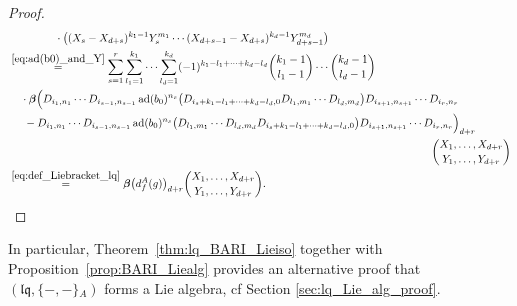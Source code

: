 \documentclass[12pt,reqno]{amsart}
\numberwithin{equation}{section}
\theoremstyle{definition}
\newcommand{\bimap}{\boldsymbol{\beta}}
\newcommand{\ad}{\operatorname{ad}}
\newcommand{\lqq}{\mathfrak{lq}}
\newcommand{\ariemp}{\{-,-\}\!_A}
\newcommand{\der}[1]{d_{#1}^A}
\begin{document}
\begin{proof}
\begin{align*}
&\hspace{1.5cm}\cdot\big((X_s-X_{d+s})^{k_1-1}Y_s^{m_1}\cdots (X_{d+s-1}-X_{d+s})^{k_d-1}Y_{d+s-1}^{m_d}\big) \\
&\overset{\eqref{eq:ad(b0)_and_Y}}{=}\sum_{s=1}^r \sum_{l_1=1}^{k_1}\cdots \sum_{l_d=1}^{k_d} (-1)^{k_1-l_1+\cdots+k_d-l_d} \binom{k_1-1}{l_1-1}\cdots \binom{k_d-1}{l_d-1} \\
&\hspace{0.4cm}\cdot\bimap\Big(D_{i_1,n_1}\cdots D_{i_{s-1},n_{s-1}}\ad(b_0)^{n_s}\big(D_{i_s+k_1-l_1+\cdots+k_d-l_d,0}D_{l_1,m_1}\cdots D_{l_d,m_d}\big)D_{i_{s+1},n_{s+1}}\cdots D_{i_r,n_r}\\
&\hspace{0.5cm}-D_{i_1,n_1}\cdots D_{i_{s-1},n_{s-1}}\ad(b_0)^{n_s}\big(D_{l_1,m_1}\cdots D_{l_d,m_d}D_{i_s+k_1-l_1+\cdots+k_d-l_d,0}\big)D_{i_{s+1},n_{s+1}}\cdots D_{i_r,n_r}\Big)_{d+r} \\
&\hspace{13.64cm} \binom{X_1,\ldots,X_{d+r}}{Y_1,\ldots,Y_{d+r}}\\
&\overset{\eqref{eq:def_Liebracket_lq}}{=} \bimap\big(\der{f}(g)\big)_{d+r}\binom{X_1,\ldots,X_{d+r}}{Y_1,\ldots,Y_{d+r}}. \qedhere
\end{align*}
\end{proof}
In particular, Theorem \ref{thm:lq_BARI_Lieiso} together with Proposition \ref{prop:BARI_Liealg} provides an alternative proof  that $(\lqq,\ariemp)$ forms a Lie algebra, cf Section \ref{sec:lq_Lie_alg_proof}.
\end{document}

